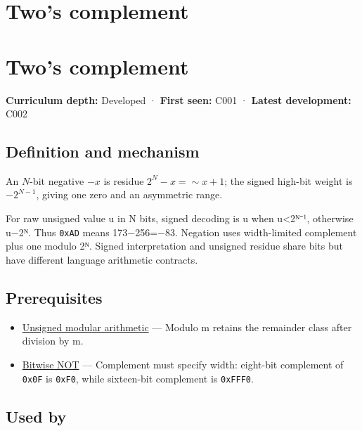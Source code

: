 \hypertarget{appendix-4fbc03d20829}{}
\section*{Two's complement}
\section{Two's complement}\label{appendix-4fbc03d20829-twos-complement}

\textbf{Curriculum depth:} Developed · \textbf{First seen:} C001 · \textbf{Latest development:} C002

\subsection{Definition and mechanism}\label{appendix-4fbc03d20829-definition-and-mechanism}

An \(N\)-bit negative \(-x\) is residue \(2^N-x=\sim x+1\); the signed high-bit weight is \(-2^{N-1}\), giving one zero and an asymmetric range.

For raw unsigned value u in N bits, signed decoding is u when u\textless2ᴺ⁻¹, otherwise u−2ᴺ. Thus \texttt{0xAD} means 173−256=−83. Negation uses width-limited complement plus one modulo 2ᴺ. Signed interpretation and unsigned residue share bits but have different language arithmetic contracts.

\subsection{Prerequisites}\label{appendix-4fbc03d20829-prerequisites}

\begin{itemize}
\tightlist
\item
  \hyperref[appendix-c99977d88b33]{Unsigned modular arithmetic} --- Modulo m retains the remainder class after division by m.
\item
  \hyperref[appendix-8f38927cfc54]{Bitwise NOT} --- Complement must specify width: eight-bit complement of \texttt{0x0F} is \texttt{0xF0}, while sixteen-bit complement is \texttt{0xFFF0}.
\end{itemize}

\subsection{Used by}\label{appendix-4fbc03d20829-used-by}


